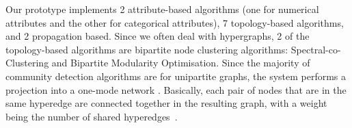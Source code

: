 



Our prototype implements 2 attribute-based algorithms (one for numerical attributes and the other for categorical attributes), 7 topology-based algorithms, and 2 propagation based. Since we often deal with hypergraphs, 2 of the topology-based algorithms are bipartite node clustering algorithms: Spectral-co-Clustering \cite{dhillonCoclusteringDocumentsWords2001} and Bipartite Modularity Optimisation\cite{guimeràModuleIdentificationBipartite2007}. Since the majority of community detection algorithms are for unipartite graphs, the system performs a projection into a one-mode network \cite{zhouBipartiteNetworkProjection2007}. Basically, each pair of nodes that are in the same hyperedge are connected together in the resulting graph, with a weight being the number of shared hyperedges~\cite{guimeràModuleIdentificationBipartite2007}.

